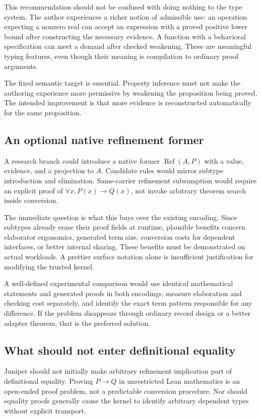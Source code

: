 \documentclass[11pt,a4paper]{article}
\theoremstyle{definition}\newtheorem{definition}[theorem]{Definition}
\theoremstyle{remark}\newtheorem{remark}[theorem]{Remark}
\begin{document}
This recommendation should not be confused with doing nothing to the type system. The author experiences a richer notion of admissible use: an operation expecting a nonzero real can accept an expression with a proved positive lower bound after constructing the necessary evidence. A function with a behavioral specification can meet a demand after checked weakening. These are meaningful typing features, even though their meaning is compilation to ordinary proof arguments.

The fixed semantic target is essential. Property inference must not make the authoring experience more permissive by weakening the proposition being proved. The intended improvement is that more evidence is reconstructed automatically for the same proposition.

\subsection{An optional native refinement former}
A research branch could introduce a native former $\operatorname{Ref}(A,P)$ with a value, evidence, and a projection to $A$. Candidate rules would mirror subtype introduction and elimination. Same-carrier refinement subsumption would require an explicit proof of $\forall x, P(x)\to Q(x)$, not invoke arbitrary theorem search inside conversion.

The immediate question is what this buys over the existing encoding. Since subtypes already erase their proof fields at runtime, plausible benefits concern elaborator ergonomics, generated term size, conversion costs for dependent interfaces, or better internal sharing. These benefits must be demonstrated on actual workloads. A prettier surface notation alone is insufficient justification for modifying the trusted kernel.

A well-defined experimental comparison would use identical mathematical statements and generated proofs in both encodings, measure elaboration and checking cost separately, and identify the exact term pattern responsible for any difference. If the problem disappears through ordinary record design or a better adapter theorem, that is the preferred solution.

\subsection{What should not enter definitional equality}
Juniper should not initially make arbitrary refinement implication part of definitional equality. Proving $P\to Q$ in unrestricted Lean mathematics is an open-ended proof problem, not a predictable conversion procedure. Nor should equality proofs generally cause the kernel to identify arbitrary dependent types without explicit transport.
\end{document}
